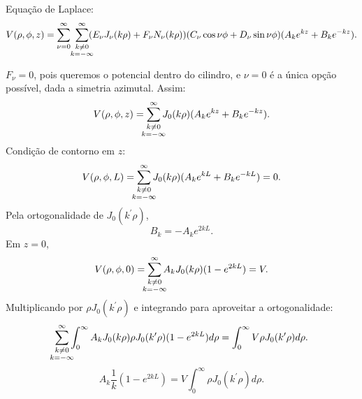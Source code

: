 \documentclass{article}
\begin{document}
Equação de Laplace:
\begin{equation}
 V(\rho,\phi,z) = \sum_{\nu = 0}^{\infty} \ \sum_{\mathclap{\substack{k \neq 0 \\ k = -\infty}}}^{\infty} (E_{\nu}J_{\nu}(k\rho) + F_{\nu}N_{\nu}(k \rho))
 (C_{\nu}\cos{\nu \phi} + D_{\nu}\sin{\nu \phi})(A_k e^{kz} + B_k e^{-kz}) \mathrm{.}
\end{equation}

$F_{\nu} = 0$, pois queremos o potencial dentro do cilindro, e $\nu = 0$ é a única opção possível, dada a simetria azimutal. Assim:
\begin{equation}
 V(\rho,\phi,z) = \sum_{\mathclap{\substack{k \neq 0 \\ k = -\infty}}}^{\infty} J_{0}(k\rho)
 (A_{k} e^{kz} + B_{k} e^{-kz}) \mathrm{.}
\end{equation}
Condição de contorno em $z$:
\begin{equation}
 V(\rho,\phi,L) = \sum_{\mathclap{\substack{k \neq 0 \\ k = -\infty}}}^{\infty} J_{0}(k\rho)
 (A_{k} e^{kL} + B_{k} e^{-kL}) = 0 \mathrm{.}
\end{equation}
Pela ortogonalidade de $J_{0}(k^{\prime}\rho)$,
\begin{equation}
 B_k = - A_k e^{2kL}\mathrm{.}
\end{equation}
Em $z = 0$,
\begin{equation}
 V(\rho,\phi,0) = \sum_{\mathclap{\substack{k \neq 0 \\ k = -\infty}}}^{\infty} A_k J_{0}(k\rho)
 (1 - e^{2kL}) = V \mathrm{.}
\end{equation}
Multiplicando por $\rho J_0(k^{\prime}\rho)$ e integrando para aproveitar a ortogonalidade:
\begin{equation}
 \sum_{\mathclap{\substack{k \neq 0 \\ k = -\infty}}}^{\infty} \int_{0}^{\infty} A_k J_{0}(k\rho) \rho J_0(k^{\prime}\rho)
 (1 - e^{2kL}) d\rho = \int_{0}^{\infty} V \rho J_0(k^{\prime}\rho) d\rho \mathrm{.}
\end{equation}
\begin{equation}
 A_k \frac{1}{k} (1 - e^{2kL}) = V \int_{0}^{\infty} \rho J_0(k^{\prime}\rho) d\rho \mathrm{.}
\end{equation}
\end{document}
